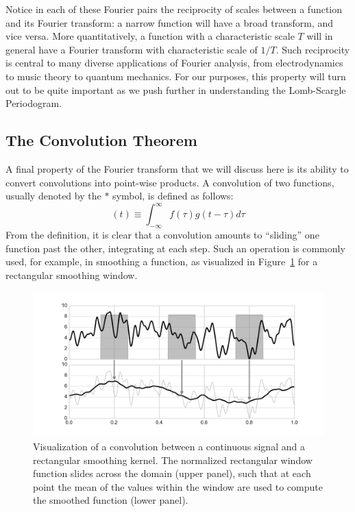 \documentclass[preprint]{aastex}
\newcommand{\Fig}[1]{Figure~\ref{fig:#1}}
\newcommand{\figlabel}[1]{\label{fig:#1}}
\newcommand{\eqlabel}[1]{\label{eq:#1}}
\begin{document}
Notice in each of these Fourier pairs the reciprocity
of scales between a function and its Fourier transform:
a narrow function will have a broad transform, and vice versa.
More quantitatively, a function with a characteristic scale $T$ will in
general have a Fourier transform with characteristic scale of $1/T$.
Such reciprocity is central to many diverse applications of Fourier analysis,
from electrodynamics to music theory to quantum mechanics.
For our purposes, this property will turn out to be quite
important as we push further in understanding the Lomb-Scargle Periodogram.


\subsection{The Convolution Theorem}

A final property of the Fourier transform that we will discuss here is its
ability to convert convolutions into point-wise products.
A convolution of two functions, usually denoted by the $\ast$ symbol,
is defined as follows:
\begin{equation}
  [f \ast g](t) \equiv \int_{-\infty}^\infty f(\tau)g(t - \tau) d\tau
  \eqlabel{convolution-definition}
\end{equation}
From the definition, it is clear that a convolution amounts to ``sliding'' one
function past the other, integrating at each step.
Such an operation is commonly used, for example, in smoothing a function,
as visualized in \Fig{convolution} for a rectangular smoothing window.

\begin{figure}[ht]
  \centering
  \includegraphics[width=\textwidth]{fig04_Convolution_Diagram}
  \caption{Visualization of a convolution between a continuous signal and a rectangular smoothing kernel.
    The normalized rectangular window function slides across the domain (upper panel),
    such that at each point the mean of the values within the window are
    used to compute the smoothed function (lower panel).
    \figlabel{convolution}}
\end{figure}
\end{document}

